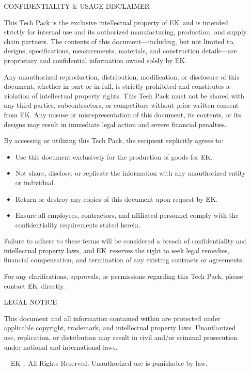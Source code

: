 \documentclass[11pt,a4paper]{article}
\newcommand{\CompanyName}{EK}
\newcommand{\techsection}[1]{
  \vspace{0.8cm}
  \begin{tcolorbox}[
    enhanced,
    colback=accentblue!80,
    colframe=accentblue,
    coltext=white,
    round corners,
    boxrule=0pt,
    width=\textwidth,
    halign=left,
    fontupper=\large\bfseries,
    top=0.4cm,
    bottom=0.4cm,
    left=0.2cm,
    right=0.2cm
  ]
    #1
  \end{tcolorbox}
  \vspace{0.3cm}
}
\begin{document}
\newpage
\techsection{CONFIDENTIALITY \& USAGE DISCLAIMER}
\begin{tcolorbox}[
  enhanced,
  colback=white,
  colframe=bordergray,
  width=\textwidth,
  arc=0mm,
  boxrule=0.5mm
]
This Tech Pack is the exclusive intellectual property of \CompanyName\ and is intended strictly for internal use and its authorized manufacturing, production, and supply chain partners. The contents of this document—including, but not limited to, designs, specifications, measurements, materials, and construction details—are proprietary and confidential information owned solely by \CompanyName.

Any unauthorized reproduction, distribution, modification, or disclosure of this document, whether in part or in full, is strictly prohibited and constitutes a violation of intellectual property rights. This Tech Pack must not be shared with any third parties, subcontractors, or competitors without prior written consent from \CompanyName. Any misuse or misrepresentation of this document, its contents, or its designs may result in immediate legal action and severe financial penalties.

By accessing or utilizing this Tech Pack, the recipient explicitly agrees to:
\begin{itemize}[itemsep=0.3cm]
  \item Use this document exclusively for the production of goods for \CompanyName.
  \item Not share, disclose, or replicate the information with any unauthorized entity or individual.
  \item Return or destroy any copies of this document upon request by \CompanyName.
  \item Ensure all employees, contractors, and affiliated personnel comply with the confidentiality requirements stated herein.
\end{itemize}

Failure to adhere to these terms will be considered a breach of confidentiality and intellectual property laws, and \CompanyName\ reserves the right to seek legal remedies, financial compensation, and termination of any existing contracts or agreements.

For any clarifications, approvals, or permissions regarding this Tech Pack, please contact \CompanyName\ directly.
\end{tcolorbox}

\vspace{0.8cm}
\techsection{LEGAL NOTICE}
\begin{tcolorbox}[
  enhanced,
  colback=white,
  colframe=bordergray,
  width=\textwidth,
  arc=0mm,
  boxrule=0.5mm
]
This document and all information contained within are protected under applicable copyright,
trademark, and intellectual property laws. Unauthorized use, replication, or distribution
may result in civil and/or criminal prosecution under national and international laws.

\textcopyright\
\ \CompanyName\ \the\year. All Rights Reserved.
Unauthorized use is punishable by law.
\end{tcolorbox}
\end{document}
